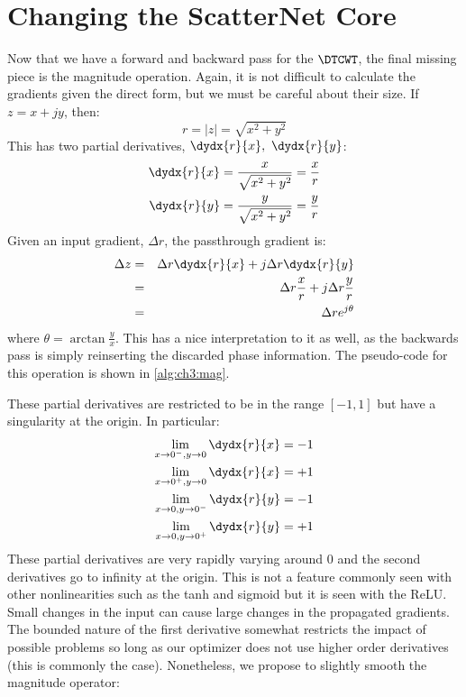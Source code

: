 \section{Changing the ScatterNet Core}\label{sec:ch3:scat}
Now that we have a forward and backward pass for the $\DTCWT$, the final missing
piece is the magnitude operation. Again, it is not difficult to calculate the
gradients given the direct form, but we must be careful about their size. If $z
= x + jy$, then:
%
\begin{equation}
  r = |z| =  \sqrt{x^2 + y^2}
\end{equation}
%
This has two partial derivatives, $\dydx{r}{x},\ \dydx{r}{y}$:
\begin{align}
  \dydx{r}{x} & =  \frac{x}{\sqrt{x^2 + y^2}} = \frac{x}{r}\\
  \dydx{r}{y} & =  \frac{y}{\sqrt{x^2 + y^2}} = \frac{y}{r} 
\end{align}
Given an input gradient, $\Delta r$, the passthrough gradient is:
\begin{eqnarray}
  \Delta z & = & \Delta r \dydx{r}{x} + j\Delta r \dydx{r}{y} \\
           &= & \Delta r \frac{x}{r} + j\Delta r \frac{y}{r} \\
           &=& \Delta r e^{j\theta}
\end{eqnarray}
where $\theta = \arctan{\frac{y}{x}}$. This has a nice interpretation to it as
well, as the backwards pass is simply reinserting the discarded phase
information. The pseudo-code for this operation is shown in
\autoref{alg:ch3:mag}.
%

These partial derivatives are restricted to be in the range $[-1, 1]$ but have a singularity at the origin. 
In particular:
\begin{align}
  \lim_{x\rightarrow 0^{-},y\rightarrow 0}  \dydx{r}{x} &= -1 \\
  \lim_{x\rightarrow 0^{+},y\rightarrow 0}  \dydx{r}{x} &= +1 \\
  \lim_{x\rightarrow 0,y\rightarrow 0^{-}}  \dydx{r}{y} &= -1 \\
  \lim_{x\rightarrow 0,y\rightarrow 0^{+}}  \dydx{r}{y} &= +1 
\end{align}
These partial derivatives are very rapidly varying around 0 and the second
derivatives go to infinity at the origin. This is not a
feature commonly seen with other nonlinearities such as the tanh and sigmoid
but it is seen with the ReLU. Small changes in the input can cause large changes
in the propagated gradients.
The bounded nature of the first derivative somewhat restricts the impact of
possible problems so
long as our optimizer does not use higher order derivatives (this is commonly
the case). Nonetheless, we propose to slightly smooth the magnitude operator:

